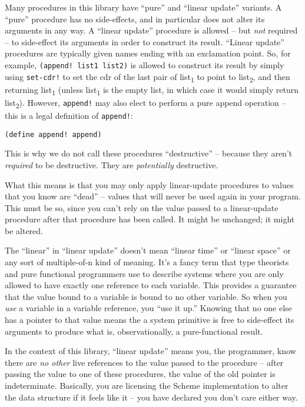 Many procedures in this library have ``pure'' and ``linear update''
variants. A ``pure'' procedure has no side-effects, and in particular
does not alter its arguments in any way. A ``linear update'' procedure
is allowed -- but \emph{not} required -- to side-effect its arguments in
order to construct its result. ``Linear update'' procedures are
typically given names ending with an exclamation point. So, for example,
\texttt{(append!\ list1\ list2)} is allowed to construct its result by
simply using \texttt{set-cdr!} to set the cdr of the last pair of
list\textsubscript{1} to point to list\textsubscript{2}, and then
returning list\textsubscript{1} (unless list\textsubscript{1} is the
empty list, in which case it would simply return list\textsubscript{2}).
However, \texttt{append!} may also elect to perform a pure append
operation -- this is a legal definition of \texttt{append!}:

\begin{verbatim}
(define append! append)
\end{verbatim}

This is why we do not call these procedures ``destructive'' -- because
they aren't \emph{required} to be destructive. They are
\emph{potentially} destructive.

What this means is that you may only apply linear-update procedures to
values that you know are ``dead'' -- values that will never be used
again in your program. This must be so, since you can't rely on the
value passed to a linear-update procedure after that procedure has been
called. It might be unchanged; it might be altered.

The ``linear'' in ``linear update'' doesn't mean ``linear time'' or
``linear space'' or any sort of multiple-of-n kind of meaning. It's a
fancy term that type theorists and pure functional programmers use to
describe systems where you are only allowed to have exactly one
reference to each variable. This provides a guarantee that the value
bound to a variable is bound to no other variable. So when you
\emph{use} a variable in a variable reference, you ``use it up.''
Knowing that no one else has a pointer to that value means the a system
primitive is free to side-effect its arguments to produce what is,
observationally, a pure-functional result.

In the context of this library, ``linear update'' means you, the
programmer, know there are \emph{no other} live references to the value
passed to the procedure -- after passing the value to one of these
procedures, the value of the old pointer is indeterminate. Basically,
you are licensing the Scheme implementation to alter the data structure
if it feels like it -- you have declared you don't care either way.

